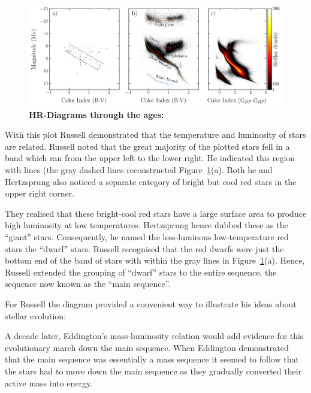 \begin{figure}
\begin{center}
  \centerline{\includegraphics[width=1.2\linewidth]{figures/hr_diagram.png}}
  \caption{\textbf{HR-Diagrams through the ages:}  }
  \label{fig:HR-diagrams}
\end{center}
\end{figure}


With this plot Russell demonstrated that the temperature and luminosity of stars are related.
Russell noted that the great majority of the plotted stars fell in a band which ran from the upper left to the lower right.
He indicated this region with lines (the gray dashed lines reconstructed Figure~\ref{fig:HR-diagrams}(a).
Both he and Hertzsprung also noticed a separate category of bright but cool red stars in the upper right corner. 

They realised that these bright-cool red stars have a large surface area to produce high luminosity at low temperatures. 
Hertzsprung hence dubbed these as the ``giant'' stars. 
Consequently, he named the less-luminous low-temperature red stars the ``dwarf'' stars. 
Russell recognised that the red dwarfs were just the bottom end of the band of stars with within the gray lines in Figure~\ref{fig:HR-diagrams}(a). 
Hence, Russell extended the grouping of ``dwarf'' stars to the entire sequence, the sequence now known as the ``main sequence''.


For Russell the diagram provided a convenient way to illustrate his ideas about stellar evolution:

A decade later, Eddington’s mass-luminosity relation would add evidence for this evolutionary march down the main sequence.
When Eddington demonstrated that the main sequence was essentially a mass sequence it seemed to follow that the stars had to move down the main sequence as they gradually converted their active mass into
energy. 

